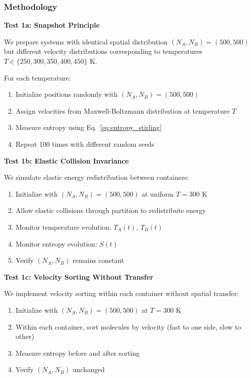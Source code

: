 \documentclass[10pt,twocolumn,letterpaper]{article}
\theoremstyle{definition}
\theoremstyle{remark}
\begin{document}
\subsubsection{Methodology}

\textbf{Test 1a: Snapshot Principle}

We prepare systems with identical spatial distribution $(N_A, N_B) = (500, 500)$ but different velocity distributions corresponding to temperatures $T \in \{250, 300, 350, 400, 450\}$ K.

For each temperature:
\begin{enumerate}
\item Initialize positions randomly with $(N_A, N_B) = (500, 500)$
\item Assign velocities from Maxwell-Boltzmann distribution at temperature $T$
\item Measure entropy using Eq.~\eqref{eq:entropy_stirling}
\item Repeat 100 times with different random seeds
\end{enumerate}

\textbf{Test 1b: Elastic Collision Invariance}

We simulate elastic energy redistribution between containers:
\begin{enumerate}
\item Initialize with $(N_A, N_B) = (500, 500)$ at uniform $T = 300$ K
\item Allow elastic collisions through partition to redistribute energy
\item Monitor temperature evolution: $T_A(t)$, $T_B(t)$
\item Monitor entropy evolution: $S(t)$
\item Verify $(N_A, N_B)$ remains constant
\end{enumerate}

\textbf{Test 1c: Velocity Sorting Without Transfer}

We implement velocity sorting within each container without spatial transfer:
\begin{enumerate}
\item Initialize with $(N_A, N_B) = (500, 500)$ at $T = 300$ K
\item Within each container, sort molecules by velocity (fast to one side, slow to other)
\item Measure entropy before and after sorting
\item Verify $(N_A, N_B)$ unchanged
\end{enumerate}
\end{document}
